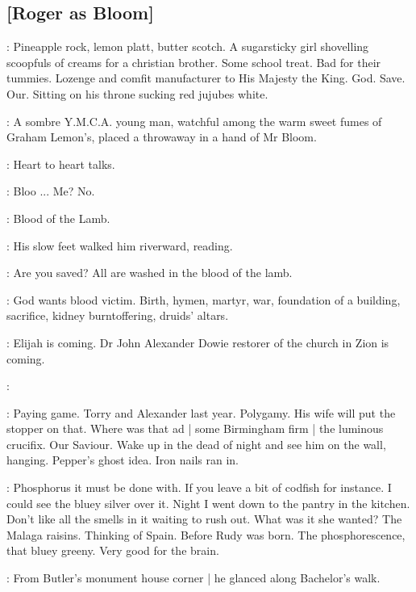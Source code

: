\subsection{[Roger as Bloom]}

\BloomInt:
Pineapple rock, lemon platt, butter scotch.
A sugarsticky girl shovelling scoopfuls of creams for a christian brother.
Some school treat.
Bad for their tummies.
Lozenge and comfit manufacturer to His Majesty the King.
God.
Save.
Our.
Sitting on his throne sucking red jujubes white.

:
A sombre Y.M.C.A. young man,
watchful among the warm sweet fumes of Graham Lemon's,
placed a throwaway in a hand of Mr Bloom.

:
Heart to heart talks.

\BloomInt:
Bloo ...
Me?
No.

\BloomInt:
Blood of the Lamb.


:
His slow feet walked him riverward, reading.

:
Are you saved?
All are washed in the blood of the lamb.

\BloomInt:
God wants blood victim.
Birth, hymen, martyr, war,
foundation of a building,
sacrifice,
kidney burntoffering,
druids' altars.

:
Elijah is coming.
Dr John Alexander Dowie restorer of the church in Zion is coming.

:

\BloomInt:
Paying game.
Torry and Alexander last year.
Polygamy.
His wife will put the stopper on that.
Where was that ad |
some Birmingham firm |
the luminous crucifix.
Our Saviour.
Wake up in the dead of night and see him on the wall, hanging.
Pepper's ghost idea.
Iron nails ran in.

\BloomInt:
Phosphorus it must be done with.
If you leave a bit of codfish for instance.
I could see the bluey silver over it.
Night I went down to the pantry in the kitchen.
Don't like all the smells in it waiting to rush out.
What was it she wanted?
The Malaga raisins.
Thinking of Spain.
Before Rudy was born.
The phosphorescence, that bluey greeny.
Very good for the brain.

:
From Butler's monument house corner |
he glanced along Bachelor's walk.

